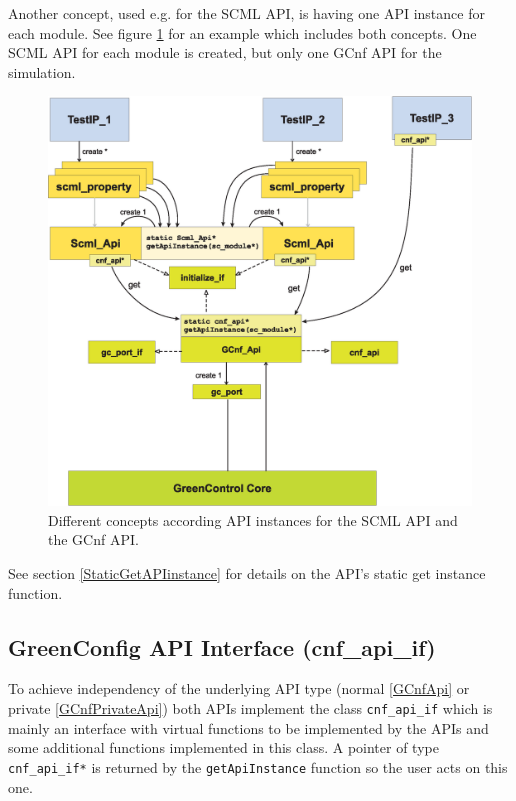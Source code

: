 Another concept, used e.g. for the SCML API, is having one API instance for each module.
See figure \ref{fig:GreenControlImplMoreApis} for an example which includes both concepts. One SCML API for each module is created, but only one GCnf API for the simulation.

\begin{figure}%
	\centerline{
		\includegraphics[width=\textwidth]{GreenControlImplMoreApis.eps}}
	\caption{Different concepts according API instances for the SCML API and the GCnf API.}
	\label{fig:GreenControlImplMoreApis}
\end{figure}

See section \ref{StaticGetAPIinstance} for details on the \GreenConfig API's static get instance function.


\subsection{GreenConfig API Interface (cnf\_api\_if)}
\label{GCnfCnfApi}
To achieve independency of the underlying API type (normal \ref{GCnfApi} or private \ref{GCnfPrivateApi}) both APIs implement the class \lstinline|cnf_api_if| which is mainly an interface with virtual functions to be implemented by the APIs and some additional functions implemented in this class. A pointer of type \lstinline|cnf_api_if*| is returned by the \lstinline|getApiInstance| function so the user acts on this one.

